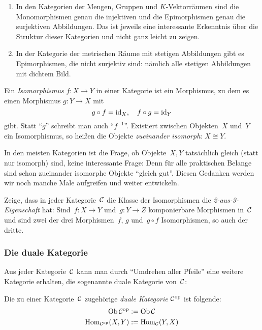 \begin{bsp}\begin{enumerate}
\item In den Kategorien der Mengen, Gruppen und $K$-Vektorräumen sind die
Monomorphismen genau die injektiven und die Epimorphismen genau die
surjektiven Abbildungen. Das ist jeweils eine interessante Erkenntnis über die
Struktur dieser Kategorien und nicht ganz leicht zu zeigen.
\item In der Kategorie der metrischen Räume mit stetigen Abbildungen gibt es
Epimorphismen, die nicht surjektiv sind: nämlich alle stetigen Abbildungen mit
dichtem Bild.
\end{enumerate}\end{bsp}

\begin{defn}
Ein \emph{Isomorphismus} $f:X \to Y$ in einer Kategorie ist ein
Morphismus, zu dem es einen Morphismus $g:Y \to X$ mit
\[ g \circ f = \mathrm{id}_X, \quad f \circ g = \mathrm{id}_Y \]
gibt. Statt "`$g$"' schreibt man auch "`$f^{-1}$"'. Existiert zwischen
Objekten~$X$ und~$Y$ ein Isomorphismus, so heißen die Objekte \emph{zueinander
isomorph}:
$X \cong Y$.
\end{defn}

\begin{bem}\label{gleichheitobj}In den meisten Kategorien ist die Frage, ob
Objekte~$X,Y$ tatsächlich gleich (statt nur isomorph) sind, keine interessante
Frage: Denn für alle praktischen Belange sind schon zueinander isomorphe
Objekte "`gleich gut"'. Diesen Gedanken werden wir noch manche Male aufgreifen
und weiter entwickeln.\end{bem}

\begin{aufg}Zeige, dass in jeder Kategorie~$\mathcal{C}$ die Klasse der Isomorphismen die
\emph{2-aus-3-Eigenschaft} hat: Sind~$f:X \to Y$ und~$g:Y \to Z$ komponierbare
Morphismen in~$\mathcal{C}$ und sind zwei der drei Morphismen~$f$, $g$ und~$g \circ f$
Isomorphismen, so auch der dritte.\end{aufg}


\subsubsection*{Die duale Kategorie}

Aus jeder Kategorie~$\mathcal{C}$ kann man durch "`Umdrehen aller Pfeile"' eine weitere
Kategorie erhalten, die sogenannte duale Kategorie von~$\mathcal{C}$:

\begin{defn}
Die zu einer Kategorie~$\mathcal{C}$ zugehörige \emph{duale Kategorie} $\mathcal{C}^{\mathrm{op}}$ ist
folgende:
\begin{align*}
  \operatorname{Ob} \mathcal{C}^{\mathrm{op}} &:= \operatorname{Ob} \mathcal{C} \\
  \mathrm{Hom}_{\mathcal{C}^{\mathrm{op}}}(X,Y) &:= \mathrm{Hom}_{\mathcal{C}}(Y,X)
\end{align*}
\end{defn}


